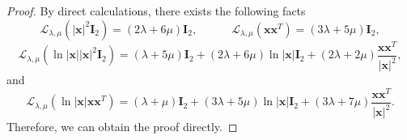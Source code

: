 \documentclass[10pt,reqno,oneside]{amsart}%
\theoremstyle{definition}
\theoremstyle{remark}
\numberwithin{equation}{section}
\numberwithin{equation}{section}
\begin{document}
\begin{proof}
By direct calculations, there exists the following facts
$$
\mathcal{L}_{\lambda,\mu}\left(|\mathbf{x}|^{2}\mathbf{I}_2\right)=(2\lambda+6\mu)\mathbf{I}_2,\quad \quad \quad \mathcal{L}_{\lambda,\mu}\left(\mathbf{x}\mathbf{x}^{T}\right)=(3\lambda+5\mu)\mathbf{I}_2,
$$
$$
\mathcal{L}_{\lambda,\mu}\left(\ln|\mathbf{x}||\mathbf{x}|^{2}\mathbf{I}_2\right)=(\lambda+5\mu)\mathbf{I}_2+(2\lambda+6\mu)\ln|\mathbf{x}|\mathbf{I}_2
+(2\lambda+2\mu)\frac{\mathbf{x}\mathbf{x}^{T}}{|\mathbf{x}|^2},
$$
and
$$
\mathcal{L}_{\lambda,\mu}\left(\ln|\mathbf{x}|\mathbf{x}\mathbf{x}^{T}\right)=(\lambda+\mu)\mathbf{I}_2+(3\lambda+5\mu)\ln|\mathbf{x}|\mathbf{I}_2
+(3\lambda+7\mu)\frac{\mathbf{x}\mathbf{x}^{T}}{|\mathbf{x}|^2}.
$$
Therefore, we can obtain the proof directly.
\end{proof}
\end{document}
